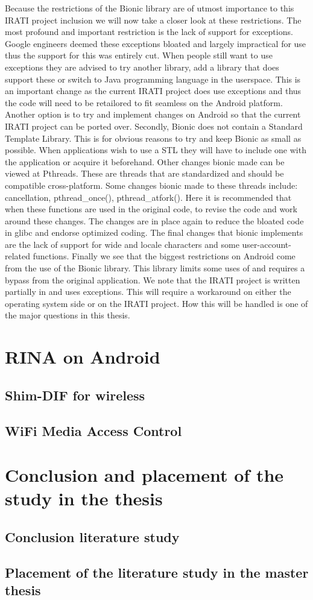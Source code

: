\npar
Because the \cpp restrictions of the Bionic library are of utmost importance to this IRATI project inclusion we will now take a closer look at these restrictions. The most profound and important restriction is the lack of support for \cpp exceptions. Google engineers deemed these exceptions bloated and largely impractical for use thus the support for this was entirely cut. When people still want to use exceptions they are advised to try another library, add a library that does support these or switch to Java programming language in the userspace. This is an important change as the current IRATI project does use \cpp exceptions and thus the code will need to be retailored to fit seamless on the Android platform. Another option is to try and implement changes on Android so that the current IRATI project can be ported over. Secondly, Bionic does not contain a \cpp Standard Template Library. This is for obvious reasons to try and keep Bionic as small as possible. When applications wish to use a \cpp STL they will have to include one with the application or acquire it beforehand. Other changes bionic made can be viewed at Pthreads. These are threads that are standardized and should be compatible cross-platform. Some changes bionic made to these threads include: cancellation, pthread\_once(), pthread\_atfork(). Here it is recommended that when these functions are used in the original code, to revise the code and work around these changes. The changes are in place again to reduce the bloated code in glibc and endorse optimized coding. The final changes that bionic implements are the lack of support for wide and locale characters and some user-account-related functions. 
\npar
Finally we see that the biggest restrictions on Android come from the use of the Bionic library. This library limits some uses of \cpp and requires a bypass from the original application. We note that the IRATI project is written partially in \cpp and uses exceptions. This will require a workaround on either the operating system side or on the IRATI project. How this will be handled is one of the major questions in this thesis. 

\chapter{RINA on Android}


\section{Shim-DIF for wireless}
\section{WiFi Media Access Control}


\chapter{Conclusion and placement of the study in the thesis}

\section{Conclusion literature study}
\section{Placement of the literature study in the master thesis}

